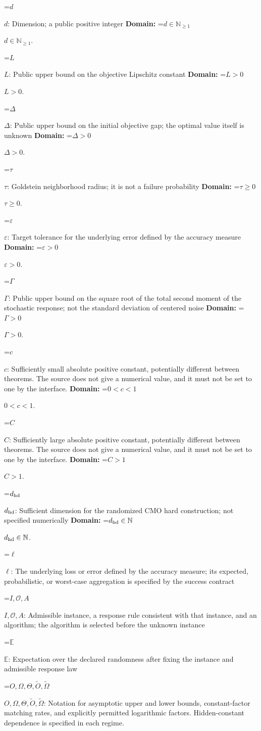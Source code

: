 \documentclass[10pt,a4paper]{article}
\newcommand{\AtlasMath}[1]{\par\begingroup\centering\setbox0=\hbox{$\displaystyle #1$}\ifdim\wd0>1.4\linewidth\typeout{ATLAS WIDE FORMULA: \the\wd0}\fi\ifdim\wd0>\linewidth\resizebox{\linewidth}{!}{\box0}\else\box0\fi\par\endgroup}
\newcommand{\AtlasInlineMath}[1]{\begingroup\setbox0=\hbox{$#1$}\ifdim\wd0>.4\linewidth\endgroup\AtlasMath{#1}\else\endgroup$#1$\fi}
\begin{document}
\AtlasInlineMath{d}: Dimension; a public positive integer \textbf{Domain:} \AtlasInlineMath{d\in\mathbb{N}_{\ge1}}.

\AtlasInlineMath{L}: Public upper bound on the objective Lipschitz constant \textbf{Domain:} \AtlasInlineMath{L>0}.

\AtlasInlineMath{\Delta}: Public upper bound on the initial objective gap; the optimal value itself is unknown \textbf{Domain:} \AtlasInlineMath{\Delta>0}.

\AtlasInlineMath{\tau}: Goldstein neighborhood radius; it is not a failure probability \textbf{Domain:} \AtlasInlineMath{\tau\ge0}.

\AtlasInlineMath{\varepsilon}: Target tolerance for the underlying error defined by the accuracy measure \textbf{Domain:} \AtlasInlineMath{\varepsilon>0}.

\AtlasInlineMath{\Gamma}: Public upper bound on the square root of the total second moment of the stochastic response; not the standard deviation of centered noise \textbf{Domain:} \AtlasInlineMath{\Gamma>0}.

\AtlasInlineMath{c}: Sufficiently small absolute positive constant, potentially different between theorems. The source does not give a numerical value, and it must not be set to one by the interface. \textbf{Domain:} \AtlasInlineMath{0<c<1}.

\AtlasInlineMath{C}: Sufficiently large absolute positive constant, potentially different between theorems. The source does not give a numerical value, and it must not be set to one by the interface. \textbf{Domain:} \AtlasInlineMath{C>1}.

\AtlasInlineMath{d_{\rm hd}}: Sufficient dimension for the randomized CMO hard construction; not specified numerically \textbf{Domain:} \AtlasInlineMath{d_{\rm hd}\in\mathbb{N}}.

\AtlasInlineMath{\ell}: The underlying loss or error defined by the accuracy measure; its expected, probabilistic, or worst-case aggregation is specified by the success contract

\AtlasInlineMath{I,\mathcal{O},A}: Admissible instance, a response rule consistent with that instance, and an algorithm; the algorithm is selected before the unknown instance

\AtlasInlineMath{\mathbb{E}}: Expectation over the declared randomness after fixing the instance and admissible response law

\AtlasInlineMath{O,\Omega,\Theta,\widetilde{O},\widetilde\Omega}: Notation for asymptotic upper and lower bounds, constant-factor matching rates, and explicitly permitted logarithmic factors. Hidden-constant dependence is specified in each regime.
\end{document}
